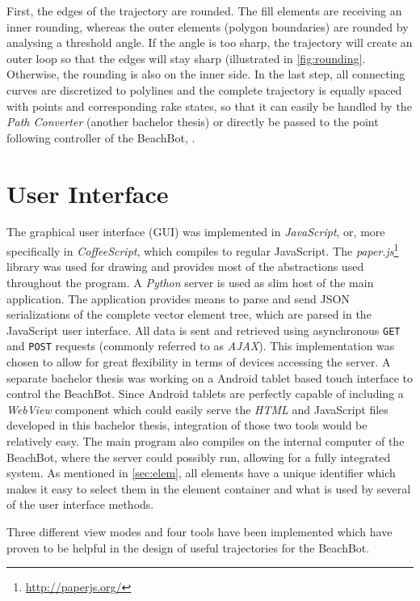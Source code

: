 First, the edges of the trajectory are rounded. The fill elements are receiving an inner rounding, whereas the outer elements (polygon boundaries) are rounded by analysing a threshold angle. If the angle is too sharp, the trajectory will create an outer loop so that the edges will stay sharp (illustrated in \autoref{fig:rounding}. Otherwise, the rounding is also on the inner side. In the last step, all connecting curves are discretized to polylines and the complete trajectory is equally spaced with points and corresponding rake states, so that it can easily be handled by the \textit{Path Converter} (another bachelor thesis) or directly be passed to the point following controller of the BeachBot, .

\section{User Interface}

The graphical user interface (GUI) was implemented in \textit{JavaScript}, or, more specifically in \textit{CoffeeScript}, which compiles to regular JavaScript. The \textit{paper.js}\footnote{\url{http://paperjs.org/}} library was used for drawing and provides most of the abstractions used throughout the program. A \textit{Python} server is used as slim host of the main application. The application provides means to parse and send JSON serializations of the complete vector element tree, which are parsed in the JavaScript user interface. All data is sent and retrieved using asynchronous \texttt{GET} and \texttt{POST} requests (commonly referred to as \textit{AJAX}). This implementation was chosen to allow for great flexibility in terms of devices accessing the server. A separate bachelor thesis was working on a Android tablet based touch interface to control the BeachBot. Since Android tablets are perfectly capable of including a \textit{WebView} component which could easily serve the \textit{HTML} and JavaScript files developed in this bachelor thesis, integration of those two tools would be relatively easy. The main program also compiles on the internal computer of the BeachBot, where the server could possibly run, allowing for a fully integrated system. As mentioned in \autoref{sec:elem}, all elements have a unique identifier which makes it easy to select them in the element container and what is used by several of the user interface methods.

Three different view modes and four tools have been implemented which have proven to be helpful in the design of useful trajectories for the BeachBot.

